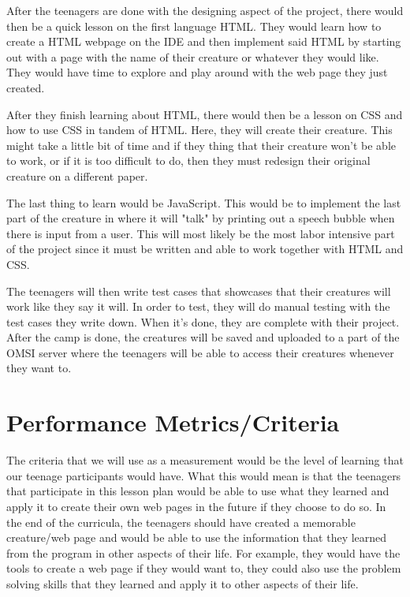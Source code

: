 \documentclass[10pt, letterpaper]{article}
\begin{document}
    After the teenagers are done with the designing aspect of the project, there would then be a quick lesson on the first language HTML. They would learn how to create a HTML webpage on the IDE and then implement said HTML by starting out with a page with the name of their creature or whatever they would like. They would have time to explore and play around with the web page they just created. 
    
    After they finish learning about HTML, there would then be a lesson on CSS and how to use CSS in tandem of HTML. Here, they will create their creature. This might take a little bit of time and if they thing that their creature won't be able to work, or if it is too difficult to do, then they must redesign their original creature on a different paper.
    
    The last thing to learn would be JavaScript. This would be to implement the last part of the creature in where it will "talk" by printing out a speech bubble when there is input from a user. This will most likely be the most labor intensive part of the project since it must be written and able to work together with HTML and CSS.
    
    The teenagers will then write test cases that showcases that their creatures will work like they say it will. In order to test, they will do manual testing with the test cases they write down. When it's done, they are complete with their project. After the camp is done, the creatures will be saved and uploaded to a part of the OMSI server where the teenagers will be able to access their creatures whenever they want to.

\newpage
\section{Performance Metrics/Criteria}
    The criteria that we will use as a measurement would be the level of learning that our teenage participants would have. What this would mean is that the teenagers that participate in this lesson plan would be able to use what they learned and apply it to create their own web pages in the future if they choose to do so. In the end of the curricula, the teenagers should have created a memorable creature/web page and would be able to use the information that they learned from the program in other aspects of their life. For example, they would have the tools to create a web page if they would want to, they could also use the problem solving skills that they learned and apply it to other aspects of their life.
\end{document}
